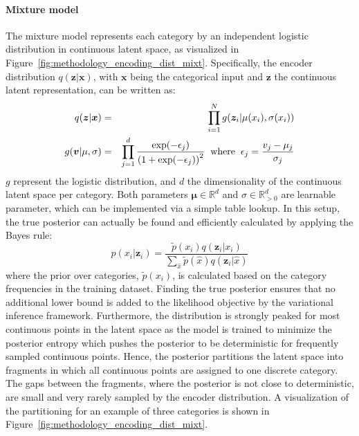 \paragraph{Mixture model} The mixture model represents each category by an independent logistic distribution in continuous latent space, as visualized in Figure~\ref{fig:methodology_encoding_dist_mixt}.
Specifically, the encoder distribution $q(\bm{z}|\bm{x})$, with $\bm{x}$ being the categorical input and $\bm{z}$ the continuous latent representation, can be written as:
\begin{eqnarray}
    q(\bm{z}|\bm{x}) & = & \prod_{i=1}^{N} g(\bm{z}_i|\mu(x_i), \sigma(x_i))\\
    g(\bm{v}|\mu, \sigma) & = & \prod_{j=1}^{d} \frac{\exp(-\epsilon_j)}{\left(1+\exp(-\epsilon_j)\right)^2}\hspace{2mm}\text{where}\hspace{2mm}\epsilon_j=\frac{v_j-\mu_j}{\sigma_j}
\end{eqnarray}
$g$ represent the logistic distribution, and $d$ the dimensionality of the continuous latent space per category. Both parameters $\bm{\mu}\in\mathbb{R}^{d}$ and $\sigma\in\mathbb{R}_{>0}^{d}$ are learnable parameter, which can be implemented via a simple table lookup. 
In this setup, the true posterior can actually be found and efficiently calculated by applying the Bayes rule:
\begin{equation}
    p(x_i|\bm{z}_i) = \frac{\tilde{p}(x_i)q(\bm{z}_i|x_i)}{\sum_{\hat{x}}\tilde{p}(\hat{x})q(\bm{z}_i|\hat{x})}
\end{equation}
where the prior over categories, $\tilde{p}(x_i)$, is calculated based on the category frequencies in the training dataset. 
Finding the true posterior ensures that no additional lower bound is added to the likelihood objective by the variational inference framework.
Furthermore, the distribution is strongly peaked for most continuous points in the latent space as the model is trained to minimize the posterior entropy which pushes the posterior to be deterministic for frequently sampled continuous points. 
Hence, the posterior partitions the latent space into fragments in which all continuous points are assigned to one discrete category. 
The gaps between the fragments, where the posterior is not close to deterministic, are small and very rarely sampled by the encoder distribution. 
A visualization of the partitioning for an example of three categories is shown in Figure~\ref{fig:methodology_encoding_dist_mixt}. 

